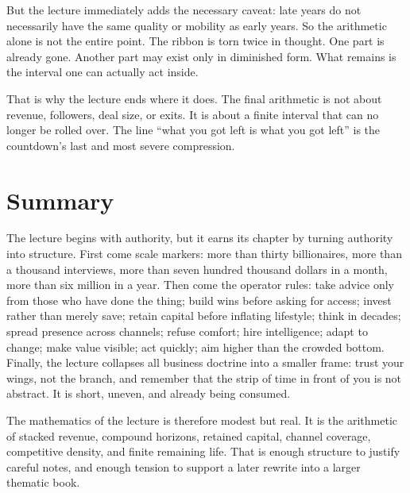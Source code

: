 But the lecture immediately adds the necessary caveat: late years do not necessarily have the same quality or mobility as early years. So the arithmetic alone is not the entire point. The ribbon is torn twice in thought. One part is already gone. Another part may exist only in diminished form. What remains is the interval one can actually act inside.

\begin{figure}[h]
\centering
{}
\end{figure}

That is why the lecture ends where it does. The final arithmetic is not about revenue, followers, deal size, or exits. It is about a finite interval that can no longer be rolled over. The line ``what you got left is what you got left'' is the countdown's last and most severe compression.

\section{Summary}

The lecture begins with authority, but it earns its chapter by turning authority into structure. First come scale markers: more than thirty billionaires, more than a thousand interviews, more than seven hundred thousand dollars in a month, more than six million in a year. Then come the operator rules: take advice only from those who have done the thing; build wins before asking for access; invest rather than merely save; retain capital before inflating lifestyle; think in decades; spread presence across channels; refuse comfort; hire intelligence; adapt to change; make value visible; act quickly; aim higher than the crowded bottom. Finally, the lecture collapses all business doctrine into a smaller frame: trust your wings, not the branch, and remember that the strip of time in front of you is not abstract. It is short, uneven, and already being consumed.

The mathematics of the lecture is therefore modest but real. It is the arithmetic of stacked revenue, compound horizons, retained capital, channel coverage, competitive density, and finite remaining life. That is enough structure to justify careful notes, and enough tension to support a later rewrite into a larger thematic book.